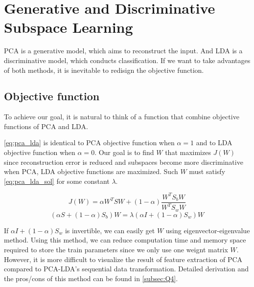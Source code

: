 \section{Generative and Discriminative Subspace Learning}
\label{sec:intro}

PCA is a generative model, which aims to reconstruct the input. And LDA is a discriminative model, which conducts classification. If we want to take advantages of both methods, it is inevitable to redisign the objective function.

\subsection{Objective function}
To achieve our goal, it is natural to think of a function that combine objective functions of PCA and LDA.

\cref{eq:pca_lda} is identical to PCA objective function when $\alpha=1$ and to LDA objective function when $\alpha=0$. Our goal is to find $W$ that maximizes $J(W)$ since reconstruction error is reduced and subspaces become more discriminative when PCA, LDA objective functions are maximized. Such $W$ must satisfy \cref{eq:pca_lda_sol} for some constant $\lambda$.

\vspace{-0.2cm}
\begin{equation}
  J(W) = \alpha W^TSW+(1-\alpha) \frac{W^TS_bW}{W^TS_wW}
  \label{eq:pca_lda}
\end{equation}
\vspace{-0.2cm}
\begin{equation}
  (\alpha S+(1-\alpha)S_b)W = \lambda (\alpha I + (1-\alpha)S_w)W
  \label{eq:pca_lda_sol}
\end{equation}

If $\alpha I + (1-\alpha)S_w$ is invertible, we can easily get $W$ using eigenvector-eigenvalue method. Using this method, we can reduce computation time and memory space required to store the train parameters since we only use one weignt matrix $W$. However, it is more difficult to visualize the result of feature extraction of PCA compared to PCA-LDA's sequential data transformation. Detailed derivation and the pros/cons of this method can be found in \cref{subsec:Q4}.
